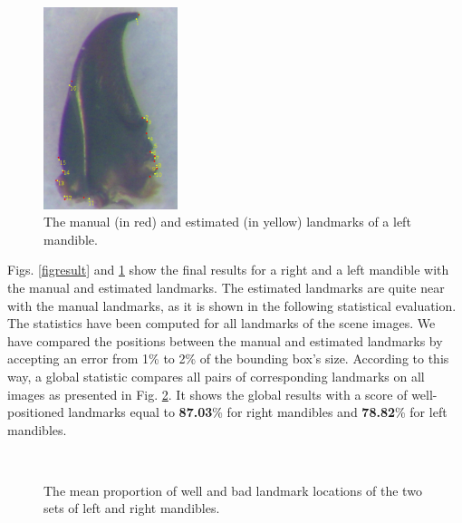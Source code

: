 \documentclass[twoside,twocolumn,10pt]{article}
\begin{document}
\begin{figure}[htbp]
\centering
\includegraphics[width=0.35\textwidth]{./images/mg_rs}
\caption{The manual (in red) and estimated (in yellow) landmarks of a left mandible.}
\label{figresult2}
\end{figure}

Figs. \ref{figresult} and \ref{figresult2} show the final results
for a right and a left mandible with the manual and estimated
landmarks. The estimated landmarks are quite near with the manual
landmarks, as it is shown in the following statistical evaluation.
\\
The statistics have been computed for all landmarks of the scene images.
We have compared the positions between the manual and estimated
landmarks by accepting an error from 1\% to 2\% of the bounding box's
size. According to this way, a global statistic compares all pairs of
corresponding landmarks on all images as presented in
Fig. \ref{figctresult}. It shows the global results with a score of
well-positioned landmarks equal to \textbf{87.03}\% for right
mandibles and \textbf{78.82}\% for left mandibles.

\begin{figure}[htbp]
\centering
{}~~
\caption{The mean proportion of well and bad landmark locations of the two sets of left and right mandibles.}
\label{figctresult}
\end{figure}
\end{document}
